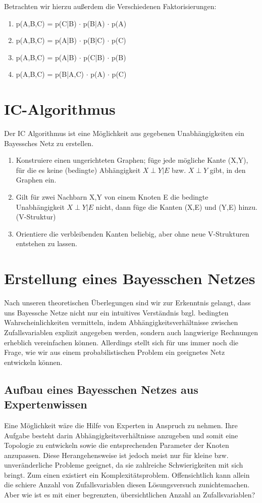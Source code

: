 Betrachten wir hierzu außerdem die Verschiedenen Faktorisierungen:
\begin{enumerate}[label=(\alph*)]
\item p(A,B,C) = p(C|B) $\cdot$ p(B|A) $\cdot$ p(A)
\item p(A,B,C) = p(A|B) $\cdot$ p(B|C) $\cdot$ p(C)
\item p(A,B,C) = p(A|B) $\cdot$ p(C|B) $\cdot$ p(B)
\item p(A,B,C) = p(B|A,C) $\cdot$ p(A) $\cdot$ p(C)
\end{enumerate}

\section{IC-Algorithmus}
Der IC Algorithmus ist eine Möglichkeit aus gegebenen Unabhängigkeiten ein Bayessches Netz zu erstellen.
\begin{enumerate}
\item Konstruiere einen ungerichteten Graphen; füge jede mögliche Kante (X,Y), für die es keine (bedingte) Abhängigkeit $X \perp Y | E$ bzw. $X \perp Y$ gibt, in den Graphen ein.
\item Gilt für zwei Nachbarn X,Y von einem Knoten E die bedingte Unabhängigkeit $X \perp Y | E$ nicht, dann füge die Kanten (X,E) und (Y,E) hinzu. (V-Struktur)
\item Orientiere die verbleibenden Kanten beliebig, aber ohne neue V-Strukturen entstehen zu lassen.
\end{enumerate}

\section{Erstellung eines Bayesschen Netzes}
Nach unseren theoretischen Überlegungen sind wir zur Erkenntnis gelangt, dass uns Bayessche Netze nicht nur ein intuitives Verständnis bzgl.
bedingten Wahrscheinlichkeiten vermitteln, indem Abhängigkeitsverhältnisse zwischen Zufallsvariablen explizit angegeben werden, sondern
auch langwierige Rechnungen erheblich vereinfachen können. Allerdings stellt sich für uns immer noch die Frage, wie wir aus einem
probabilistischen Problem ein geeignetes Netz entwickeln können.


\subsection{Aufbau eines Bayesschen Netzes aus Expertenwissen}   
Eine Möglichkeit wäre die Hilfe von Experten in Anspruch zu nehmen. Ihre Aufgabe besteht darin Abhängigkeitsverhältnisse anzugeben und
somit eine Topologie zu entwickeln sowie die entsprechenden Parameter der Knoten anzupassen. Diese Herangehensweise ist jedoch meist
nur für kleine bzw. unveränderliche Probleme geeignet, da sie zahlreiche Schwierigkeiten mit sich bringt.
Zum einen existiert ein Komplexitätsproblem. Offensichtlich kann allein die schiere Anzahl von Zufallsvariablen diesen Lösungsversuch
zunichtemachen. Aber wie ist es mit einer begrenzten, übersichtlichen Anzahl an Zufallsvariablen? 

